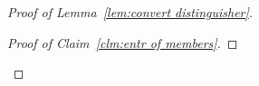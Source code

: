 \begin{proof}[Proof of Lemma~\ref{lem:convert distinguisher}]
\begin{proof}[Proof of Claim~\ref{clm:entr of members}]
%
%


\end{proof}
\end{proof}
